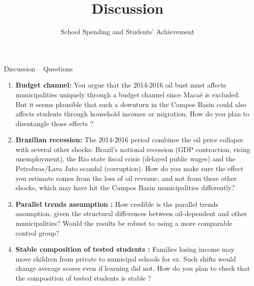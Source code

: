 \documentclass[10pt,aspectratio=169]{beamer}
\title{Discussion}
\subtitle{School Spending and Students' Achievement}
\date{}
\begin{document}
\begin{frame}{Discussion -- Questions}
\small
\begin{enumerate}

    \item \textbf{Budget channel:}
    You argue that the 2014-2016 oil bust must affects
    municipalities uniquely through a budget channel
    since Macaé is excluded. But it seems plausible
    that such a downturn in the Campos Basin could
    also affects students through household incomes
    or migration. How do you plan to disentangle
    those effects ?

    \vspace{0.2cm}

    \item \textbf{Brazilian recession:}
The 2014-2016 period combines the oil price collapse with several other shocks: Brazil's national recession (GDP contraction, rising unemployment), the Rio state fiscal crisis (delayed public wages) and the Petrobras/Lava Jato scandal (corruption). How do you make sure the effect you estimate comes from the loss of oil revenue, and not from these other shocks, which may have hit the Campos Basin municipalities differently?

    \vspace{0.2cm}

    \item \textbf{Parallel trends assumption : }
    How credible is the parallel trends assumption,
    given the structural differences between
    oil-dependent and other municipalities?
    Would the results be robust to using a more
    comparable control group?

    \vspace{0.2cm}

    \item \textbf{Stable composition of tested students :}
    Families losing income may move children from private to municipal 
    schools for ex. Such shifts would change average scores even if learning did not.
     How do you plan to check 
    that the composition of tested students
     is stable ?

\end{enumerate}
\end{frame}



\end{document}
